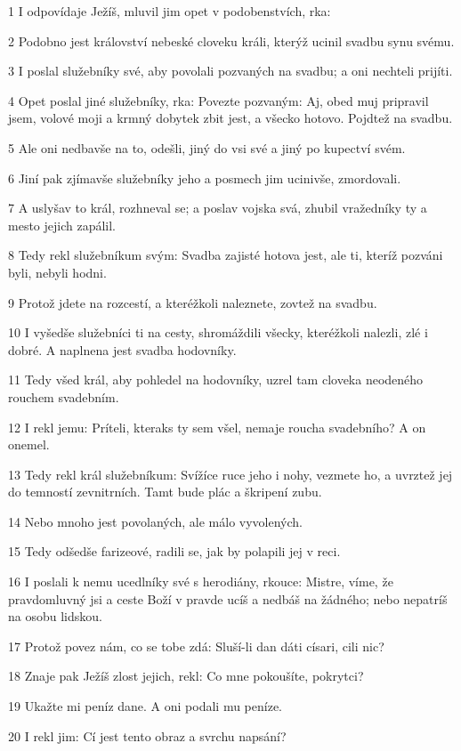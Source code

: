 \par 1 I odpovídaje Ježíš, mluvil jim opet v podobenstvích, rka:
\par 2 Podobno jest království nebeské cloveku králi, kterýž ucinil svadbu synu svému.
\par 3 I poslal služebníky své, aby povolali pozvaných na svadbu; a oni nechteli prijíti.
\par 4 Opet poslal jiné služebníky, rka: Povezte pozvaným: Aj, obed muj pripravil jsem, volové moji a krmný dobytek zbit jest, a všecko hotovo. Pojdtež na svadbu.
\par 5 Ale oni nedbavše na to, odešli, jiný do vsi své a jiný po kupectví svém.
\par 6 Jiní pak zjímavše služebníky jeho a posmech jim ucinivše, zmordovali.
\par 7 A uslyšav to král, rozhneval se; a poslav vojska svá, zhubil vražedníky ty a mesto jejich zapálil.
\par 8 Tedy rekl služebníkum svým: Svadba zajisté hotova jest, ale ti, kteríž pozváni byli, nebyli hodni.
\par 9 Protož jdete na rozcestí, a kteréžkoli naleznete, zovtež na svadbu.
\par 10 I vyšedše služebníci ti na cesty, shromáždili všecky, kteréžkoli nalezli, zlé i dobré. A naplnena jest svadba hodovníky.
\par 11 Tedy všed král, aby pohledel na hodovníky, uzrel tam cloveka neodeného rouchem svadebním.
\par 12 I rekl jemu: Príteli, kteraks ty sem všel, nemaje roucha svadebního? A on onemel.
\par 13 Tedy rekl král služebníkum: Svížíce ruce jeho i nohy, vezmete ho, a uvrztež jej do temností zevnitrních. Tamt bude plác a škripení zubu.
\par 14 Nebo mnoho jest povolaných, ale málo vyvolených.
\par 15 Tedy odšedše farizeové, radili se, jak by polapili jej v reci.
\par 16 I poslali k nemu ucedlníky své s herodiány, rkouce: Mistre, víme, že pravdomluvný jsi a ceste Boží v pravde ucíš a nedbáš na žádného; nebo nepatríš na osobu lidskou.
\par 17 Protož povez nám, co se tobe zdá: Sluší-li dan dáti císari, cili nic?
\par 18 Znaje pak Ježíš zlost jejich, rekl: Co mne pokoušíte, pokrytci?
\par 19 Ukažte mi peníz dane. A oni podali mu peníze.
\par 20 I rekl jim: Cí jest tento obraz a svrchu napsání?
